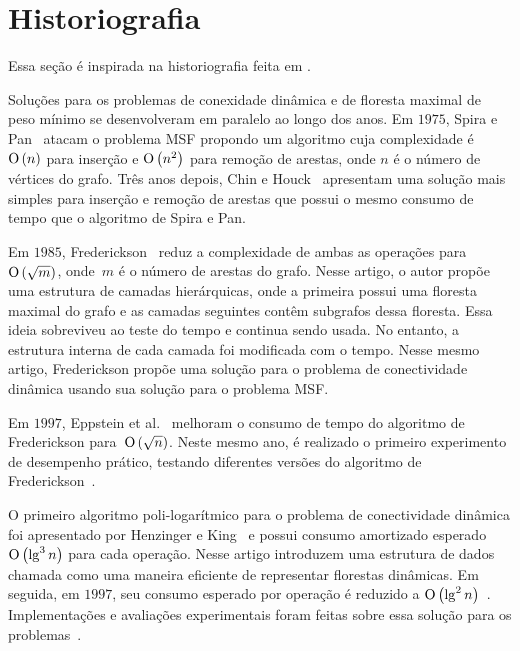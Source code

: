 \section{Historiografia}

Essa seção é inspirada na historiografia feita em \cite{QC22, HHSRecentAdvances2022, bruceM}.

Soluções para os problemas de conexidade dinâmica e de floresta maximal de peso mínimo se desenvolveram em paralelo ao longo dos anos. Em $1975$, Spira e Pan~\cite{SP1975} atacam o problema MSF propondo um algoritmo cuja complexidade é $\text{O}\left(n\right)$ para inserção e $\text{O}\left(n^2\right)$ para remoção de arestas, onde $n$ é o número de vértices do grafo. Três anos depois, Chin e Houck~\cite{CH1978} apresentam uma solução mais simples para inserção e remoção de arestas que possui o mesmo consumo de tempo que o algoritmo de Spira e Pan.

Em $1985$, Frederickson~\cite{frederickson1983data} reduz a complexidade de ambas as operações para $\text{O}\left(\sqrt{m}\right)$, onde~$m$ é o número de arestas do grafo. Nesse artigo, o autor propõe uma estrutura de camadas hierárquicas, onde a primeira possui uma floresta maximal do grafo e as camadas seguintes contêm subgrafos dessa floresta. Essa ideia sobreviveu ao teste do tempo e continua sendo usada. No entanto, a estrutura interna de cada camada foi modificada com o tempo. Nesse mesmo artigo, Frederickson propõe uma solução para o problema de conectividade dinâmica usando sua solução para o problema MSF.

Em $1997$, Eppstein et al.~\cite{Eppstein1992SparsificationaTF} melhoram o consumo de tempo do algoritmo de Frederickson para~$\text{O}\left(\sqrt{n}\right)$. Neste mesmo ano, é realizado o primeiro experimento de desempenho prático, testando diferentes versões do algoritmo de Frederickson~\cite{xpAnalyGiuseppe}.

O primeiro algoritmo poli-logarítmico para o problema de conectividade dinâmica foi apresentado por Henzinger e King~\cite{HenzingerKing} e possui consumo amortizado esperado $\text{O}\left(\lg^3 n\right)$ para cada operação. Nesse artigo introduzem uma estrutura de dados chamada  como uma maneira eficiente de representar florestas dinâmicas. Em seguida, em $1997$, seu consumo esperado por operação é reduzido a $\text{O}\left(\lg^2 n\right)$~\cite{HenzingerThorup}.  Implementações e avaliações experimentais foram feitas sobre essa solução para os problemas~\cite{EmpiricalStudy1997, EmpiricalStudy2002, Zaroliagis2002}.

